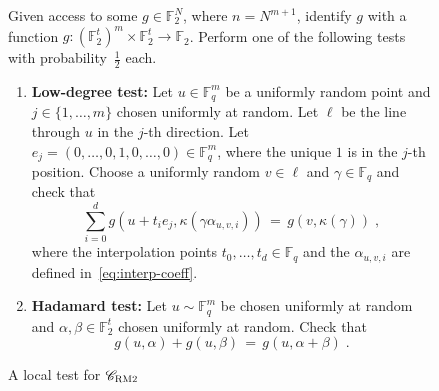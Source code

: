\documentclass[11pt]{article}
\theoremstyle{definition}
\newcommand{\code}{\mathscr{C}}
\newcommand{\F}{\ensuremath{\mathbb{F}}}
\newcommand{\bRM}{\ensuremath{\textsc{RM2}}}
\newenvironment{gamespec}{
  \begin{mdframed}[style=figstyle]}{
  \end{mdframed}}
\begin{document}
\begin{figure}[!htbp]
  \centering
  \begin{gamespec}
Given access to some $g\in \F_2^{N}$, where $n=N^{m+1}$, identify $g$ with a function $g:(\F_2^t)^m \times \F_2^t \to \F_2$. Perform one of the following tests with probability~$\tfrac{1}{2}$ each. 
\begin{enumerate}
	\item \textbf{Low-degree test:}
		Let $u \in \F_q^m$ be a uniformly random point and $j\in \{1,\ldots,m\}$ chosen uniformly at random. Let $\ell$ be the line through $u$ in the $j$-th direction. Let $e_j=(0,\ldots,0,1,0,\ldots,0)\in \F_q^m$, where the unique $1$ is in the $j$-th position. Choose a uniformly random $v\in \ell$ and $\gamma\in \F_q$ and check that 
		\[\sum_{i=0}^d g(u+t_i e_j,\kappa(\gamma \alpha_{u,v,i})) \,=\, g(v,\kappa(\gamma))\;,\]
		where the interpolation points $t_0,\ldots,t_d \in \F_q$ and the $\alpha_{u,v,i}$ are defined in~\eqref{eq:interp-coeff}.
	\item \textbf{Hadamard test:} Let $u\sim\F_q^m$ be chosen uniformly at random and $\alpha,\beta\in \F_2^t$ chosen uniformly at random. Check that 
	\[g(u,\alpha)+g(u,\beta)\,=\,g(u,\alpha+\beta)\;.\] 	
    \end{enumerate}
  \end{gamespec}
  \caption{A local test for $\code_{\bRM}$}
  \label{fig:bRM-tester}
\end{figure}
\end{document}
